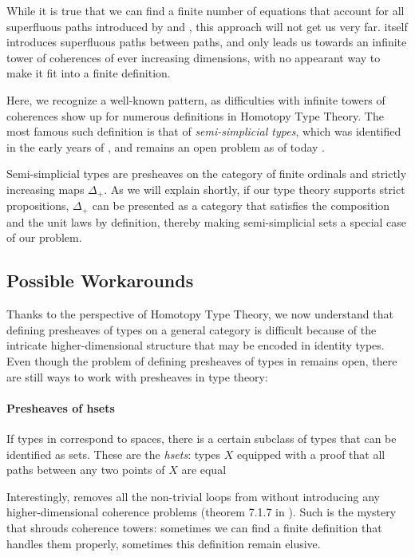 While it is true that we can find a finite number of equations that account for 
all superfluous paths introduced by  and , this 
approach will not get us very far. 
% 
 itself introduces superfluous paths between paths, and only
leads us towards an infinite tower of coherences of ever increasing 
dimensions, with no appearant way to make it fit into a finite definition.

Here, we recognize a well-known pattern, as difficulties with infinite 
towers of coherences show up for numerous definitions in Homotopy Type Theory.
% 
The most famous such definition is that of \emph{semi-simplicial types}, 
which was identified in the early years of \HoTT \cite{IAS2012semisimplicial}, 
and remains an open problem as of today .

Semi-simplicial types are presheaves on the category of finite ordinals and 
strictly increasing maps \( \Delta_+ \).
% 
As we will explain shortly, if our type theory supports strict propositions,
\( \Delta_+ \) can be presented as a category that satisfies the composition
and the unit laws by definition, thereby making semi-simplicial sets a special
case of our problem.

\subsection{Possible Workarounds}

Thanks to the perspective of Homotopy Type Theory, we now understand that
defining presheaves of types on a general category is difficult because of the 
intricate higher-dimensional structure that may be encoded in identity types.
% 
Even though the problem of defining presheaves of types in \MLTT remains open, 
there are still ways to work with presheaves in type theory:

\paragraph{Presheaves of hsets} If types in \HoTT correspond to spaces, there 
is a certain subclass of types that can be identified as sets.
% 
These are the \emph{hsets}: types \( X \) equipped with a proof that all 
paths between any two points of \( X \) are equal


Interestingly,  removes all the non-trivial loops from 
 without introducing any higher-dimensional coherence problems 
(theorem 7.1.7 in ). 
% 
Such is the mystery that shrouds coherence towers: sometimes we can find 
a finite definition that handles them properly, sometimes this definition 
remain elusive.

